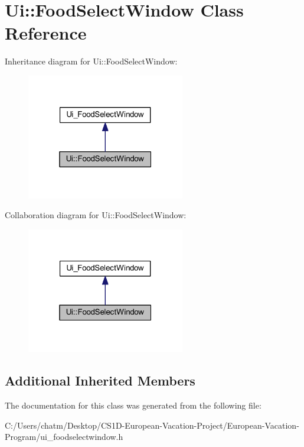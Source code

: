 \hypertarget{class_ui_1_1_food_select_window}{}\section{Ui\+::Food\+Select\+Window Class Reference}
\label{class_ui_1_1_food_select_window}


Inheritance diagram for Ui\+::Food\+Select\+Window\+:
\nopagebreak
\begin{figure}[H]
\begin{center}
\leavevmode
\includegraphics[width=196pt]{class_ui_1_1_food_select_window__inherit__graph}
\end{center}
\end{figure}


Collaboration diagram for Ui\+::Food\+Select\+Window\+:
\nopagebreak
\begin{figure}[H]
\begin{center}
\leavevmode
\includegraphics[width=196pt]{class_ui_1_1_food_select_window__coll__graph}
\end{center}
\end{figure}
\subsection*{Additional Inherited Members}


The documentation for this class was generated from the following file\+:\begin{DoxyCompactItemize}
\item 
C\+:/\+Users/chatm/\+Desktop/\+C\+S1\+D-\/\+European-\/\+Vacation-\/\+Project/\+European-\/\+Vacation-\/\+Program/ui\+\_\+foodselectwindow.\+h\end{DoxyCompactItemize}
